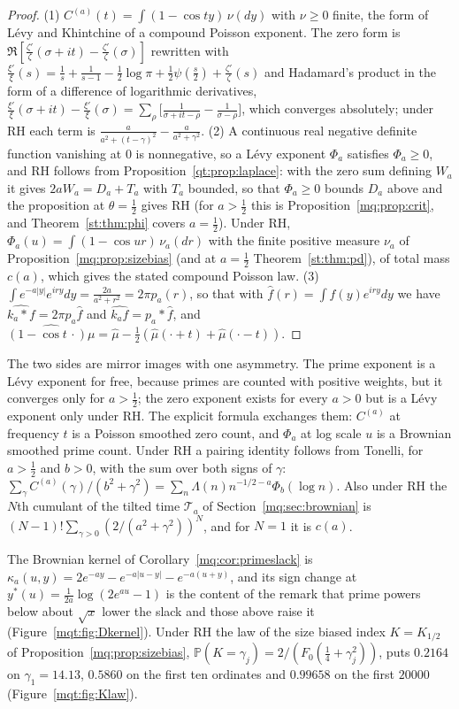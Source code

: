 \begin{proof}
(1) $C^{(a)}(t)=\int(1-\cos ty)\,\nu(dy)$ with $\nu\ge0$ finite, the form of Lévy and Khintchine of a compound Poisson exponent. The zero form is $\Re[\frac{\zeta'}\zeta(\sigma+it)-\frac{\zeta'}\zeta(\sigma)]$ rewritten with $\frac{\xi'}\xi(s)=\frac1s+\frac1{s-1}-\frac12\log\pi+\frac12\psi(\frac s2)+\frac{\zeta'}\zeta(s)$ and Hadamard's product in the form of a difference of logarithmic derivatives, $\frac{\xi'}\xi(\sigma+it)-\frac{\xi'}\xi(\sigma)=\sum_\rho\big[\frac1{\sigma+it-\rho}-\frac1{\sigma-\rho}\big]$, which converges absolutely; under RH each term is $\frac a{a^2+(t-\gamma)^2}-\frac a{a^2+\gamma^2}$.
(2) A continuous real negative definite function vanishing at $0$ is nonnegative, so a L\'evy exponent $\Phi_a$ satisfies $\Phi_a\ge0$, and RH follows from Proposition~\ref{qt:prop:laplace}: with the zero sum defining $W_a$ it gives $2aW_a=D_a+T_a$ with $T_a$ bounded, so that $\Phi_a\ge0$ bounds $D_a$ above and the proposition at $\theta=\frac12$ gives RH (for $a>\frac12$ this is Proposition~\ref{mq:prop:crit}, and Theorem~\ref{st:thm:phi} covers $a=\frac12$). Under RH, $\Phi_a(u)=\int(1-\cos ur)\,\nu_a(dr)$ with the finite positive measure $\nu_a$ of Proposition~\ref{mq:prop:sizebias} (and at $a=\frac12$ Theorem~\ref{st:thm:pd}), of total mass $c(a)$, which gives the stated compound Poisson law.
(3) $\int e^{-a|y|}e^{iry}dy=\frac{2a}{a^2+r^2}=2\pi p_a(r)$, so that with $\hat f(r)=\int f(y)e^{iry}dy$ we have $\widehat{k_a*f}=2\pi p_a\hat f$ and $\widehat{k_af}=p_a*\hat f$, and $\widehat{(1-\cos t\,\cdot)\mu}=\hat\mu-\frac12(\hat\mu(\cdot+t)+\hat\mu(\cdot-t))$.
\end{proof}

The two sides are mirror images with one asymmetry. The prime exponent is a L\'evy exponent for free, because primes are counted with positive weights, but it converges only for $a>\frac12$; the zero exponent exists for every $a>0$ but is a L\'evy exponent only under RH. The explicit formula exchanges them: $C^{(a)}$ at frequency $t$ is a Poisson smoothed zero count, and $\Phi_a$ at log scale $u$ is a Brownian smoothed prime count. Under RH a pairing identity follows from Tonelli, for $a>\frac12$ and $b>0$, with the sum over both signs of $\gamma$: $\sum_\gamma C^{(a)}(\gamma)/(b^2+\gamma^2)=\sum_n\Lambda(n)n^{-1/2-a}\Phi_b(\log n)$. Also under RH the $N$th cumulant of the tilted time $\mathcal T_a$ of Section~\ref{mq:sec:brownian} is $(N-1)!\sum_{\gamma>0}(2/(a^2+\gamma^2))^N$, and for $N=1$ it is $c(a)$.

The Brownian kernel of Corollary~\ref{mq:cor:primeslack} is $\kappa_a(u,y)=2e^{-ay}-e^{-a|u-y|}-e^{-a(u+y)}$, and its sign change at $y^*(u)=\frac1{2a}\log(2e^{au}-1)$ is the content of the remark that prime powers below about $\sqrt x$ lower the slack and those above raise it (Figure~\ref{mqt:fig:Dkernel}). Under RH the law of the size biased index $K=K_{1/2}$ of Proposition~\ref{mq:prop:sizebias}, $\mathbb P(K=\gamma_j)=2/(F_0(\frac14+\gamma_j^2))$, puts $0.2164$ on $\gamma_1=14.13$, $0.5860$ on the first ten ordinates and $0.99658$ on the first $20000$ (Figure~\ref{mqt:fig:Klaw}).

